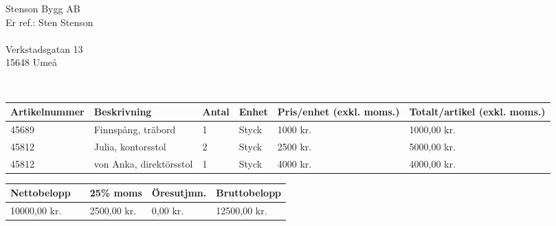 \documentclass[DIN, pagenumber=false, parskip=half,
               fromalign=right, fromphone=true, fromfax=false,
               fromrule=false]{scrlttr2}
\begin{document}
 
\begin{letter}{
	Stenson Bygg AB\\ 
	Er ref.:  Sten Stenson\\ \ \\
	Verkstadsgatan 13\\
	15648 Umeå
}

\opening{\ }
\vspace{-1.5cm}

\begin{longtable}{p{2.5cm}p{5.5cm}p{1cm}p{1cm}p{2.5cm}p{2.5cm}}
	\hline 	
	Artikelnummer & Beskrivning & Antal & Enhet & Pris/enhet (exkl. moms.) & Totalt/artikel (exkl. moms.)\\
	\hline 
	
	45689 & Finnspång, träbord & 1 & Styck & 1000 kr. & 1000,00 kr.\\
	45812 & Julia, kontorsstol  & 2 & Styck & 2500 kr. & 5000,00 kr.\\
	45812 & von Anka, direktörsstol  & 1 & Styck & 4000 kr. & 4000,00 kr.\\
	
	\hline\hline 
\end{longtable}


\begin{longtable}{p{5.5cm}p{2.5cm}p{2.5cm}p{2.5cm}p{2.5cm}}
	\hline Nettobelopp &   & 25\% moms &  Öresutjmn.  & Bruttobelopp\\
	\hline 
	10000,00 kr. &   & 2500,00 kr.  &  0,00 kr.  & 12500,00 kr.\\
	\hline 
	\hline 	
\end{longtable}


\end{letter}
\end{document}
